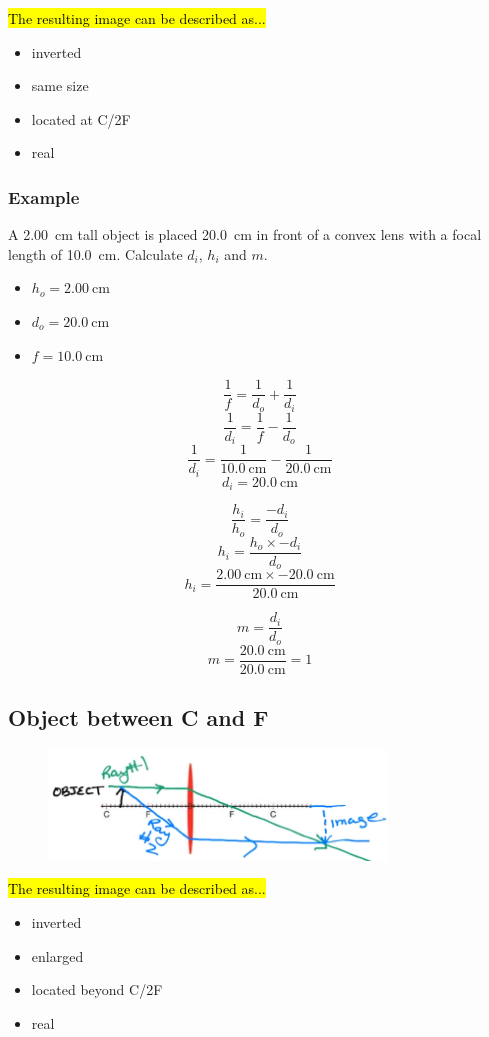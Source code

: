 \documentclass[a4paper,12pt]{article}
\begin{document}
\hl{The resulting image can be described as...}
\begin{itemize}
    \item{inverted}
    \item{same size}
    \item{located at C/2F}
    \item{real}
\end{itemize}

\pagebreak
\subsubsection{Example}
A \SI{2.00}{\cm} tall object is placed \SI{20.0}{\cm} in front of a convex lens with a focal length of \SI{10.0}{\cm}. Calculate $d_i$, $h_i$ and $m$.
\begin{itemize}
    \item{$h_o = \SI{2.00}{\cm}$}
    \item{$d_o = \SI{20.0}{\cm}$}
    \item{$f = \SI{10.0}{\cm}$}
\end{itemize}
$$\frac{1}{f} = \frac{1}{d_o} + \frac{1}{d_i}$$
$$\frac{1}{d_i} = \frac{1}{f} - \frac{1}{d_o}$$
$$\frac{1}{d_i} = \frac{1}{\SI{10.0}{\cm}} - \frac{1}{\SI{20.0}{\cm}}$$
$$d_i = \SI{20.0}{\cm}$$

$$\frac{h_i}{h_o} = \frac{-d_i}{d_o}$$
$$h_i = \frac{h_o \times -d_i}{d_o}$$
$$h_i = \frac{\SI{2.00}{\cm} \times \SI{-20.0}{\cm}}{\SI{20.0}{\cm}}$$

$$m = \frac{d_i}{d_o}$$
$$m = \frac{\SI{20.0}{\cm}}{\SI{20.0}{\cm}} = 1$$

\pagebreak
\subsection{Object between C and F}
\begin{figure}[H]
    \centering
    \includegraphics[width=0.8\textwidth]{convex-bfc}
\end{figure}

\hl{The resulting image can be described as...}
\begin{itemize}
    \item{inverted}
    \item{enlarged}
    \item{located beyond C/2F}
    \item{real}
\end{itemize}
\end{document}
